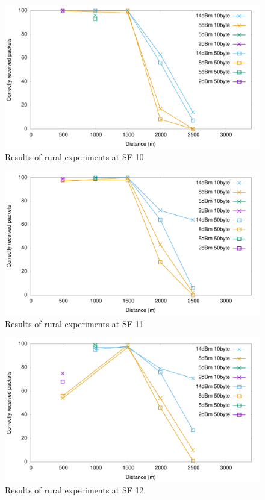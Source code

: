 \begin{figure}[]
\centering
\includegraphics[width=\textwidth]{img/test/rural/sf10}
\caption{Results of rural experiments at SF 10}
\label{fig:sf10rural}
\end{figure}

\begin{figure}[]
\centering
\includegraphics[width=\textwidth]{img/test/rural/sf11}
\caption{Results of rural experiments at SF 11}
\label{fig:sf11rural}
\end{figure}

\begin{figure}[]
\centering
\includegraphics[width=\textwidth]{img/test/rural/sf12}
\caption{Results of rural experiments at SF 12}
\label{fig:sf12rural}
\end{figure}


